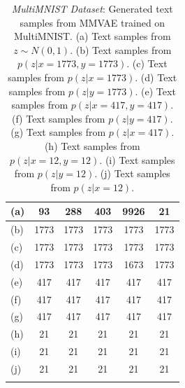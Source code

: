 \documentclass{article}
\begin{document}
\begin{table}[!h]
    \centering
    \begin{tabular}{ l | c | c | c | c | c }
        (a) & 93 & 288 & 403 & 9926 & 21 \\
        \hline
        (b) & 1773 & 1773 & 1773 & 1773 & 1773 \\
        \hline
        (c) & 1773 & 1773 & 1773 & 1773 & 1773 \\
        \hline
        (d) & 1773 & 1773 & 1773 & 1673 & 1773 \\
        \hline
        (e) & 417 & 417 & 417 & 417 & 417 \\
        \hline
        (f) & 417 & 417 & 417 & 417 & 417 \\
        \hline
        (g) & 417 & 417 & 417 & 417 & 417 \\
        \hline
        (h) & 21 & 21 & 21 & 21 & 21 \\
        \hline
        (i) & 21 & 21 & 21 & 21 & 21 \\
        \hline
        (j) & 21 & 21 & 21 & 21 & 21 \\
        \newline
    \end{tabular}
    \caption{\emph{MultiMNIST Dataset}: Generated text samples from MMVAE trained on MultiMNIST. (a) Text samples from $z \sim N(0, 1)$. (b) Text samples from $p(z|x=1773,y=1773)$. (c) Text samples from $p(z|x=1773)$. (d) Text samples from $p(z|y=1773)$. (e) Text samples from $p(z|x=417,y=417)$. (f) Text samples from $p(z|y=417)$. (g) Text samples from $p(z|x=417)$. (h) Text samples from $p(z|x=12,y=12)$. (i) Text samples from $p(z|y=12)$. (j) Text samples from $p(z|x=12)$.}
    \label{table:mnist:samples}
\end{table}
\end{document}
